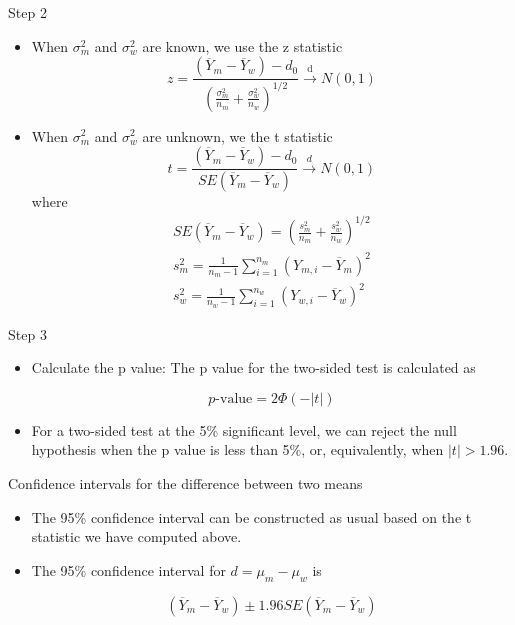 \documentclass[presentation]{beamer}
\begin{document}
\begin{frame}[shrink,label={sec:orgc9d4c81}]{Step 2}
\begin{itemize}
\item When \(\sigma^2_m\) and \(\sigma^2_w\) are known, we use the z statistic
\[ z = \frac{(\overline{Y}_m - \overline{Y}_w) - d_0}{\left(
  \frac{\sigma^2_m}{n_m} + \frac{\sigma^2_w}{n_w} \right)^{1/2}}
  \xrightarrow{\text{ d }} N(0, 1) \]

\item When \(\sigma^2_m\) and \(\sigma^2_w\) are unknown, we the t
statistic
\[ t = \frac{(\overline{Y}_m - \overline{Y}_w) -
  d_0}{SE(\overline{Y}_m - \overline{Y}_w)} \xrightarrow{d}
  N(0, 1) \] 
where
\begin{gather*}
SE(\overline{Y}_m - \overline{Y}_w) = \left(\frac{s^2_m}{n_m} + \frac{s^2_w}{n_w} \right)^{1/2} \\
s^2_m = \frac{1}{n_m-1}\sum^{n_m}_{i=1}(Y_{m,i} - \overline{Y}_m)^2 \\
s^2_w = \frac{1}{n_w-1}\sum^{n_w}_{i=1}(Y_{w,i} - \overline{Y}_w)^2
\end{gather*}
\end{itemize}
\end{frame}

\begin{frame}[label={sec:org4343fb2}]{Step 3}
\begin{itemize}
\item Calculate the p value: The p value for the two-sided test is calculated as 

\[ p\text{-value} = 2\Phi(-|t|) \]

\item For a two-sided test at the 5\% significant level, we can reject
the null hypothesis when the p value is less than 5\%, or,
equivalently, when \(|t| > 1.96\).
\end{itemize}
\end{frame}

\begin{frame}[label={sec:orge545ba2}]{Confidence intervals for the difference between two means}
\begin{itemize}
\item The 95\% confidence interval can be constructed as usual based on the t
statistic we have computed above.

\item The 95\% confidence interval for \(d = \mu_m - \mu_w\) is

\[ (\overline{Y}_m - \overline{Y}_w) \pm 1.96SE(\overline{Y}_m -
  \overline{Y}_w) \]
\end{itemize}
\end{frame}
\end{document}

